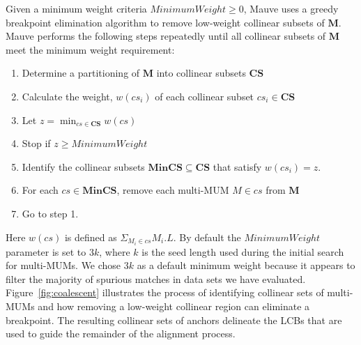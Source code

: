 \documentclass[titlepage,11pt]{article}
\begin{document}
Given a minimum weight criteria $MinimumWeight \geq 0$, Mauve uses a greedy
breakpoint elimination algorithm
to remove low-weight collinear subsets of $\mathbf{M}$.  Mauve performs the
following steps repeatedly until all collinear subsets of $\mathbf{M}$ meet the
minimum weight requirement:
\begin{enumerate}
\item Determine a partitioning of $\mathbf{M}$ into collinear subsets
$\mathbf{CS}$
\item Calculate the weight, $w(cs_i)$ of each collinear subset $cs_i \in \mathbf{CS}$
\item Let $z = \min_{cs \in \mathbf{CS}}{ w( cs ) }$
\item Stop if $z \geq MinimumWeight$
\item Identify the collinear subsets $\mathbf{MinCS} \subseteq \mathbf{CS}$ that satisfy
$w( cs_i ) = z$.
\item For each $cs \in \mathbf{MinCS}$, remove each multi-MUM $M \in cs$ from $\mathbf{M}$
\item Go to step 1.
\end{enumerate}
Here $w(cs)$ is defined as $\Sigma_{M_i \in cs}{M_i.L }$. %
By default the $MinimumWeight$ parameter is set to $3k$, where $k$ is the
seed length used during the initial search for multi-MUMs.  We chose $3k$ as a
default minimum weight because it appears to filter the majority of spurious
matches in data sets we have evaluated.
Figure~\ref{fig:coalescent} illustrates the process of identifying collinear
sets of multi-MUMs and how removing a low-weight collinear
region can eliminate a breakpoint.
The resulting collinear sets of anchors delineate the LCBs that
are used to guide the remainder of the alignment process.


\end{document}
